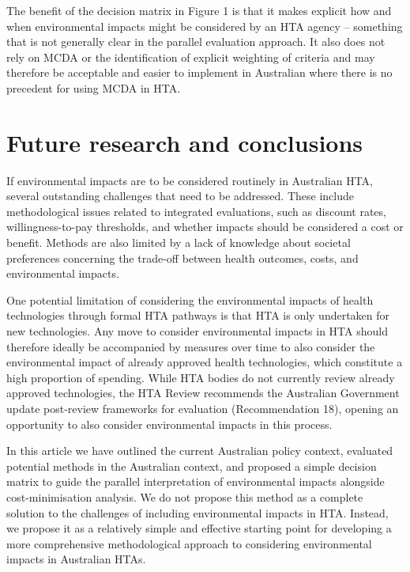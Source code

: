 \begin{refsection}
The benefit of the decision matrix in Figure 1 is that it makes explicit how and when environmental impacts might be considered by an HTA agency – something that is not generally clear in the parallel evaluation approach. It also does not rely on MCDA or the identification of explicit weighting of criteria and may therefore be acceptable and easier to implement in Australian where there is no precedent for using MCDA in HTA.

\section{Future research and conclusions }
If environmental impacts are to be considered routinely in Australian HTA, several outstanding challenges that need to be addressed. These include methodological issues related to integrated evaluations, such as discount rates, willingness-to-pay thresholds, and whether impacts should be considered a cost or benefit. Methods are also limited by a lack of knowledge about societal preferences concerning the trade-off between health outcomes, costs, and environmental impacts.

One potential limitation of considering the environmental impacts of health technologies through formal HTA pathways is that HTA is only undertaken for new technologies. Any move to consider environmental impacts in HTA should therefore ideally be accompanied by measures over time to also consider the environmental impact of already approved health technologies, which constitute a high proportion of spending. While HTA bodies do not currently review already approved technologies, the HTA Review recommends the Australian Government update post-review frameworks for evaluation (Recommendation 18), opening an opportunity to also consider environmental impacts in this process. 

In this article we have outlined the current Australian policy context, evaluated potential methods in the Australian context, and proposed a simple decision matrix to guide the parallel interpretation of environmental impacts alongside cost-minimisation analysis. We do not propose this method as a complete solution to the challenges of including environmental impacts in HTA. Instead, we propose it as a relatively simple and effective starting point for developing a more comprehensive methodological approach to considering environmental impacts in Australian HTAs. \textcolor{white}{\cite{national_institute_for_health_and_care_excellence_hta_nodate} \cite{noauthor_health_2025} \cite{canadian_agency_for_drugs_and_technologies_in_health_health_2015} \cite{benard_environmental_2025} \cite{canadas_drug_agency_ahead_2022}}

\printbibliography[heading=subbibliography]
\end{refsection}